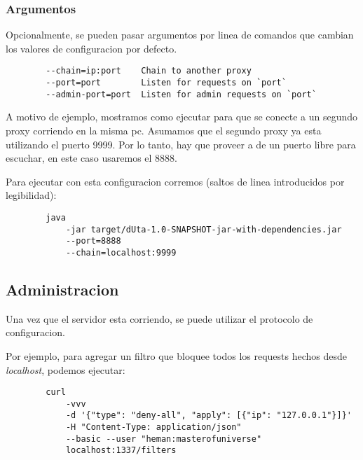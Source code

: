 \documentclass[11pt,a4paper,titlepage]{article}
\begin{document}
    \subsubsection{Argumentos}
    Opcionalmente, se pueden pasar argumentos por linea de comandos que cambian los valores de configuracion por defecto.
    \begin{verbatim}
        --chain=ip:port    Chain to another proxy
        --port=port        Listen for requests on `port`
        --admin-port=port  Listen for admin requests on `port`
    \end{verbatim}

    A motivo de ejemplo, mostramos como ejecutar \duta para que se conecte a un segundo proxy corriendo en la misma pc.
    Asumamos que el segundo proxy ya esta utilizando el puerto 9999.
    Por lo tanto, hay que proveer a \duta de un puerto libre para escuchar, en este caso usaremos el 8888.

    Para ejecutar con esta configuracion corremos (saltos de linea introducidos por legibilidad):
    \begin{verbatim}
        java
            -jar target/dUta-1.0-SNAPSHOT-jar-with-dependencies.jar
            --port=8888
            --chain=localhost:9999
    \end{verbatim}

    \subsection{Administracion}
    Una vez que el servidor esta corriendo, se puede utilizar el protocolo de configuracion.

    Por ejemplo, para agregar un filtro que bloquee todos los requests hechos desde \textit{localhost}, podemos ejecutar:
    \begin{verbatim}
        curl
            -vvv
            -d '{"type": "deny-all", "apply": [{"ip": "127.0.0.1"}]}'
            -H "Content-Type: application/json"
            --basic --user "heman:masterofuniverse"
            localhost:1337/filters
    \end{verbatim}


\end{document}
